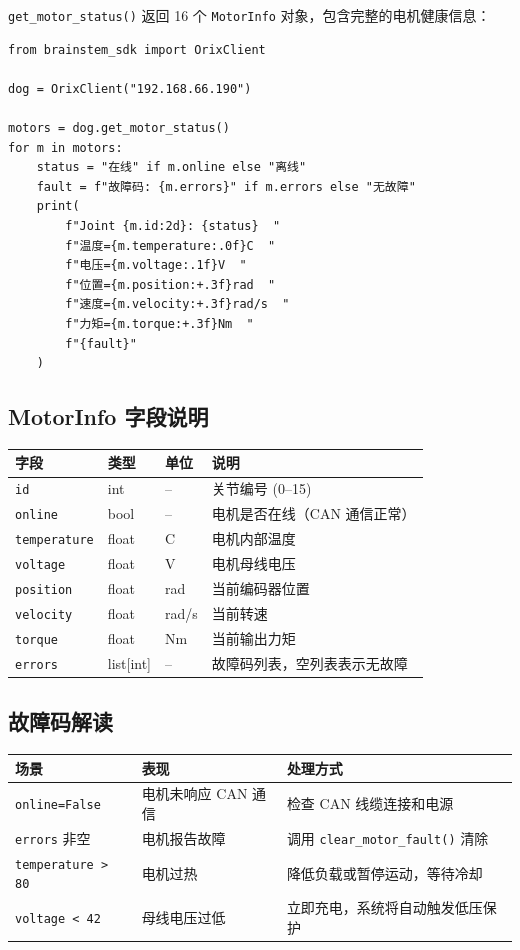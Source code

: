 \documentclass[a4paper,11pt,openany]{book}
\begin{document}
\texttt{get\_motor\_status()} 返回 16 个 \texttt{MotorInfo} 对象，包含完整的电机健康信息：

\begin{lstlisting}[style=python]
from brainstem_sdk import OrixClient

dog = OrixClient("192.168.66.190")

motors = dog.get_motor_status()
for m in motors:
    status = "在线" if m.online else "离线"
    fault = f"故障码: {m.errors}" if m.errors else "无故障"
    print(
        f"Joint {m.id:2d}: {status}  "
        f"温度={m.temperature:.0f}C  "
        f"电压={m.voltage:.1f}V  "
        f"位置={m.position:+.3f}rad  "
        f"速度={m.velocity:+.3f}rad/s  "
        f"力矩={m.torque:+.3f}Nm  "
        f"{fault}"
    )
\end{lstlisting}

\subsection{MotorInfo 字段说明}

\begin{longtable}{llll}
\toprule
字段 & 类型 & 单位 & 说明 \\
\midrule
\endhead
\texttt{id} & int & -- & 关节编号 (0--15) \\
\texttt{online} & bool & -- & 电机是否在线（CAN 通信正常） \\
\texttt{temperature} & float & C & 电机内部温度 \\
\texttt{voltage} & float & V & 电机母线电压 \\
\texttt{position} & float & rad & 当前编码器位置 \\
\texttt{velocity} & float & rad/s & 当前转速 \\
\texttt{torque} & float & Nm & 当前输出力矩 \\
\texttt{errors} & list[int] & -- & 故障码列表，空列表表示无故障 \\
\bottomrule
\end{longtable}

\subsection{故障码解读}

\begin{longtable}{lll}
\toprule
场景 & 表现 & 处理方式 \\
\midrule
\endhead
\texttt{online=False} & 电机未响应 CAN 通信 & 检查 CAN 线缆连接和电源 \\
\texttt{errors} 非空 & 电机报告故障 & 调用 \texttt{clear\_motor\_fault()} 清除 \\
\texttt{temperature > 80} & 电机过热 & 降低负载或暂停运动，等待冷却 \\
\texttt{voltage < 42} & 母线电压过低 & 立即充电，系统将自动触发低压保护 \\
\bottomrule
\end{longtable}
\end{document}
